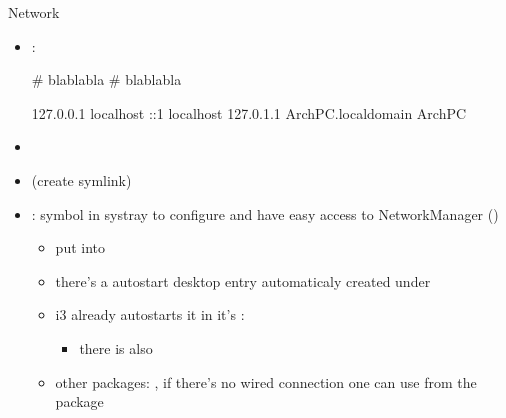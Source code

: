\begin{frame}{Network}
  \begin{itemize}
     \item {}:
       \begin{terminal}[]
        # blablabla
        # blablabla

        127.0.0.1 localhost
        ::1 localhost
        127.0.1.1 ArchPC.localdomain ArchPC
     \end{terminal}
    \item {}
    \item {} (create symlink)
    \item {}: symbol in systray to configure and have easy access to NetworkManager ()
      \begin{itemize}
      \item put  into 
      \item there's a autostart desktop entry automaticaly created under 
      \item i3 already autostarts it in it's : 
      \begin{Sidenote}
        \begin{itemize}
          \item there is also 
        \end{itemize}
      \end{Sidenote}
      \end{itemize}
  \begin{Sidenote}
    \begin{itemize}
      \item other packages: , if there's no wired connection one can use  from the  package
    \end{itemize}
  \end{Sidenote}
  \end{itemize}
\end{frame}

